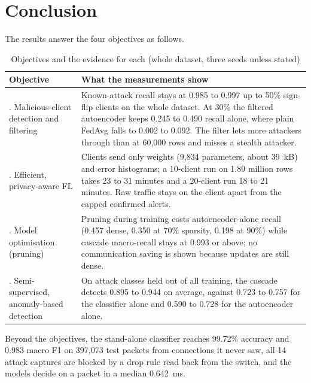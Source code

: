 \section{Conclusion}
The results answer the four objectives as follows.
\begin{table}[H]
\centering
\small
\renewcommand{\arraystretch}{1.2}
\begin{tabular}{|>{\raggedright\arraybackslash}p{3.7cm}|>{\raggedright\arraybackslash}p{9.8cm}|}
\hline
\textbf{Objective} & \textbf{What the measurements show} \\ \hline
1. Malicious-client detection and filtering & Known-attack recall stays at 0.985 to 0.997 up to 50\% sign-flip clients on the whole dataset. At 30\% the filtered autoencoder keeps 0.245 to 0.490 recall alone, where plain FedAvg falls to 0.002 to 0.092. The filter lets more attackers through than at 60{,}000 rows and misses a stealth attacker. \\ \hline
2. Efficient, privacy-aware FL & Clients send only weights (9{,}834 parameters, about 39~kB) and error histograms; a 10-client run on 1.89 million rows takes 23 to 31 minutes and a 20-client run 18 to 21 minutes. Raw traffic stays on the client apart from the capped confirmed alerts. \\ \hline
3. Model optimisation (pruning) & Pruning during training costs autoencoder-alone recall (0.457 dense, 0.350 at 70\% sparsity, 0.198 at 90\%) while cascade macro-recall stays at 0.993 or above; no communication saving is shown because updates are still dense. \\ \hline
4. Semi-supervised, anomaly-based detection & On attack classes held out of all training, the cascade detects 0.895 to 0.944 on average, against 0.723 to 0.757 for the classifier alone and 0.590 to 0.728 for the autoencoder alone. \\ \hline
\end{tabular}
\caption{Objectives and the evidence for each (whole dataset, three seeds unless stated)}
\end{table}
Beyond the objectives, the stand-alone classifier reaches 99.72\% accuracy and 0.983 macro F1 on 397{,}073 test packets from connections it never saw, all 14 attack captures are blocked by a drop rule read back from the switch, and the models decide on a packet in a median 0.642~ms.
